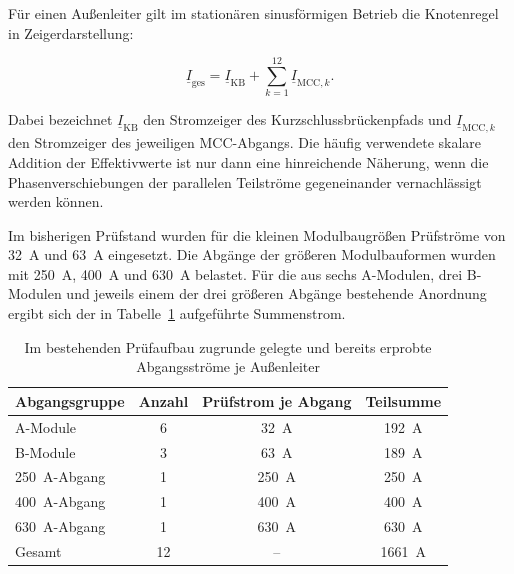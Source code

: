 Für einen Außenleiter gilt im stationären sinusförmigen Betrieb die
Knotenregel in Zeigerdarstellung:

\begin{equation}
    \underline{I}_\mathrm{ges}
    =
    \underline{I}_\mathrm{KB}
    +
    \sum_{k=1}^{12}\underline{I}_{\mathrm{MCC},k}.
    \label{eq:ist_strombilanz}
\end{equation}

Dabei bezeichnet \(\underline{I}_\mathrm{KB}\) den Stromzeiger des
Kurzschlussbrückenpfads und \(\underline{I}_{\mathrm{MCC},k}\) den
Stromzeiger des jeweiligen MCC-Abgangs. Die häufig verwendete skalare
Addition der Effektivwerte ist nur dann eine hinreichende Näherung, wenn die
Phasenverschiebungen der parallelen Teilströme gegeneinander vernachlässigt
werden können.

Im bisherigen Prüfstand wurden für die kleinen Modulbaugrößen Prüfströme von
\SI{32}{\ampere} und \SI{63}{\ampere} eingesetzt. Die Abgänge der größeren
Modulbauformen wurden mit \SI{250}{\ampere}, \SI{400}{\ampere} und
\SI{630}{\ampere} belastet. Für die aus sechs A-Modulen, drei B-Modulen und
jeweils einem der drei größeren Abgänge bestehende Anordnung ergibt sich der
in Tabelle~\ref{tab:ist_belastungskonfiguration} aufgeführte Summenstrom.

\begin{table}[H]
    \centering
    \caption{Im bestehenden Prüfaufbau zugrunde gelegte und bereits
    erprobte Abgangsströme je Außenleiter}
    \label{tab:ist_belastungskonfiguration}
    \begin{tabular}{lccc}
        \toprule
        Abgangsgruppe & Anzahl & Prüfstrom je Abgang & Teilsumme \\
        \midrule
        A-Module & 6 & \SI{32}{\ampere} & \SI{192}{\ampere} \\
        B-Module & 3 & \SI{63}{\ampere} & \SI{189}{\ampere} \\
        \SI{250}{\ampere}-Abgang & 1 & \SI{250}{\ampere} &
        \SI{250}{\ampere} \\
        \SI{400}{\ampere}-Abgang & 1 & \SI{400}{\ampere} &
        \SI{400}{\ampere} \\
        \SI{630}{\ampere}-Abgang & 1 & \SI{630}{\ampere} &
        \SI{630}{\ampere} \\
        \midrule
        Gesamt & 12 & -- & \SI{1661}{\ampere} \\
        \bottomrule
    \end{tabular}
\end{table}

